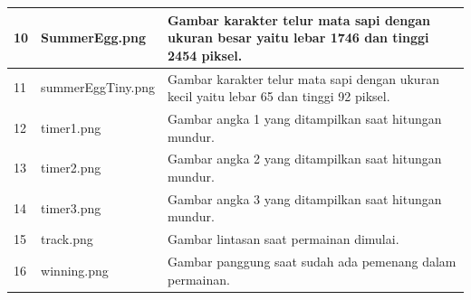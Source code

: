 \begin{enumerate}
\begin{enumerate}
\begin{table}[H]
\begin{tabular}{|p{0.35cm}|p{4cm}|p{7cm}|}
				10 & SummerEgg.png & Gambar karakter telur mata sapi dengan ukuran besar yaitu lebar 1746 dan tinggi 2454 piksel. \\ \hline
				11 & summerEggTiny.png & Gambar karakter telur mata sapi dengan ukuran kecil yaitu lebar 65 dan tinggi 92 piksel. \\ \hline
				12 & timer1.png & Gambar angka 1 yang ditampilkan saat hitungan mundur. \\ \hline
				13 & timer2.png & Gambar angka 2 yang ditampilkan saat hitungan mundur. \\ \hline
				14 & timer3.png & Gambar angka 3 yang ditampilkan saat hitungan mundur. \\ \hline
				15 & track.png & Gambar lintasan saat permainan dimulai. \\ \hline
				16 & winning.png & Gambar panggung saat sudah ada pemenang dalam permainan. \\ \hline
			\end{tabular}
			\label{table:gambar_images}
		\end{table}
		 

\end{enumerate}
\end{enumerate}
